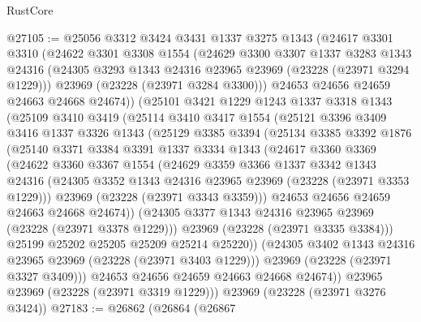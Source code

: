 \begin{lexlean}{RustCore}
\begin{coremodule}
@27105 := @25056
    @3312
    @3424
    @3431
    @1337
    @3275
    @1343
    (@24617
      @3301
      @3310
      (@24622
        @3301
        @3308
        @1554
        (@24629
          @3300
          @3307
          @1337
          @3283
          @1343
          @24316
          (@24305 @3293 @1343 @24316 @23965 @23969 (@23228 (@23971 @3294 @1229)))
          @23969
          (@23228 (@23971 @3284 @3300)))
        @24653
        @24656
        @24659
        @24663
        @24668
        @24674))
    (@25101
      @3421
      @1229
      @1243
      @1337
      @3318
      @1343
      (@25109
        @3410
        @3419
        (@25114
          @3410
          @3417
          @1554
          (@25121
            @3396
            @3409
            @3416
            @1337
            @3326
            @1343
            (@25129
              @3385
              @3394
              (@25134
                @3385
                @3392
                @1876
                (@25140
                  @3371
                  @3384
                  @3391
                  @1337
                  @3334
                  @1343
                  (@24617
                    @3360
                    @3369
                    (@24622
                      @3360
                      @3367
                      @1554
                      (@24629
                        @3359
                        @3366
                        @1337
                        @3342
                        @1343
                        @24316
                        (@24305 @3352 @1343 @24316 @23965 @23969 (@23228 (@23971 @3353 @1229)))
                        @23969
                        (@23228 (@23971 @3343 @3359)))
                      @24653
                      @24656
                      @24659
                      @24663
                      @24668
                      @24674))
                  (@24305 @3377 @1343 @24316 @23965 @23969 (@23228 (@23971 @3378 @1229)))
                  @23969
                  (@23228 (@23971 @3335 @3384)))
                @25199
                @25202
                @25205
                @25209
                @25214
                @25220))
            (@24305 @3402 @1343 @24316 @23965 @23969 (@23228 (@23971 @3403 @1229)))
            @23969
            (@23228 (@23971 @3327 @3409)))
          @24653
          @24656
          @24659
          @24663
          @24668
          @24674))
      @23965
      @23969
      (@23228 (@23971 @3319 @1229)))
    @23969
    (@23228 (@23971 @3276 @3424))
@27183 := @26862
    (@26864
      (@26867

\end{coremodule}
\end{lexlean}
